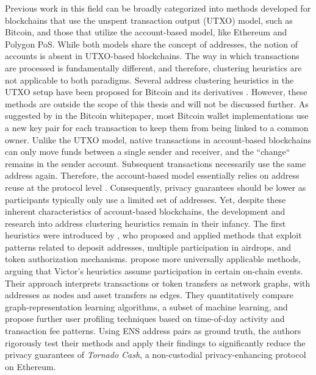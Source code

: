 \documentclass[12pt,a4paper,titlepage,oneside,english]{article}
\begin{document}
Previous work in this field can be broadly categorized into methods developed for blockchains that use the unspent transaction output (UTXO) model, such as Bitcoin, and those that utilize the account-based model, like Ethereum and Polygon PoS. 
While both models share the concept of addresses, the notion of accounts is absent in UTXO-based blockchains. The way in which transactions are processed is fundamentally different, and therefore, clustering heuristics are not applicable to both paradigms. \newline
Several address clustering heuristics in the UTXO setup have been proposed for Bitcoin and its derivatives \citep{Androulaki2013, Meiklejohn2013, Haslhofer2016, jourdan2018, kappos2022}. However, these methods are outside the scope of this thesis and will not be discussed further. \newline 
As suggested by \cite{nakamotoBitcoin2008} in the Bitcoin whitepaper, most Bitcoin wallet implementations use a new key pair for each transaction to keep them from being linked to a common owner. Unlike the UTXO model, native transactions in account-based blockchains can only move funds between a single sender and receiver, and the ``change`` remains in the sender account. Subsequent transactions necessarily use the same address again. Therefore, the account-based model essentially relies on address reuse at the protocol level \citep{Beres2020}. Consequently, privacy guarantees should be lower as participants typically only use a limited set of addresses. \newline
Yet, despite these inherent characteristics of account-based blockchains, the development and research into address clustering heuristics remain in their infancy. 
The first heuristics were introduced by \cite{FV:17}, who proposed and applied methods that exploit patterns related to deposit addresses, multiple participation in airdrops, and token authorization mechanisms. \newline
\cite{Beres2020} propose more universally applicable methods, arguing that Victor’s heuristics assume participation in certain on-chain events. Their approach interprets transactions or token transfers as network graphs, with addresses as nodes and asset transfers as edges. They quantitatively compare graph-representation learning algorithms, a subset of machine learning, and propose further user profiling techniques based on time-of-day activity and transaction fee patterns. Using ENS address pairs as ground truth, the authors rigorously test their methods and apply their findings to significantly reduce the privacy guarantees of \textit{Tornado Cash}, a non-custodial privacy-enhancing protocol on Ethereum. \newline
\end{document}
